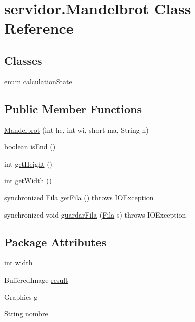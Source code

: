 \hypertarget{classservidor_1_1Mandelbrot}{}\section{servidor.\+Mandelbrot Class Reference}
\label{classservidor_1_1Mandelbrot}
\subsection*{Classes}
\begin{DoxyCompactItemize}
\item 
enum \hyperlink{enumservidor_1_1Mandelbrot_1_1calculationState}{calculation\+State}
\end{DoxyCompactItemize}
\subsection*{Public Member Functions}
\begin{DoxyCompactItemize}
\item 
\hyperlink{classservidor_1_1Mandelbrot_a2db8624e4b8e35be6c0d11c2ba66db41}{Mandelbrot} (int he, int wi, short ma, String n)
\item 
boolean \hyperlink{classservidor_1_1Mandelbrot_a3fc4593c70644aa3664e282b0cdfd0a3}{is\+End} ()
\item 
int \hyperlink{classservidor_1_1Mandelbrot_a905432e23be2e50504d449c29af8c030}{get\+Height} ()
\item 
int \hyperlink{classservidor_1_1Mandelbrot_a8852f55f8065884efcbb17ab789401ce}{get\+Width} ()
\item 
synchronized \hyperlink{classservidor_1_1Fila}{Fila} \hyperlink{classservidor_1_1Mandelbrot_ac31fee99afedf55af9e50a920398927d}{get\+Fila} ()  throws I\+O\+Exception
\item 
synchronized void \hyperlink{classservidor_1_1Mandelbrot_a46450ff3801397824de8fdb6bf82c6e3}{guardar\+Fila} (\hyperlink{classservidor_1_1Fila}{Fila} s)  throws I\+O\+Exception
\end{DoxyCompactItemize}
\subsection*{Package Attributes}
\begin{DoxyCompactItemize}
\item 
int \hyperlink{classservidor_1_1Mandelbrot_afc820ea6c9992894d55fa4c024ee7fb1}{width}
\item 
Buffered\+Image \hyperlink{classservidor_1_1Mandelbrot_a7ffdb7e65dc12cace2516fdb2882d47d}{result}
\item 
Graphics \hyperlink{classservidor_1_1Mandelbrot_afc3c91039c0345ef6a23b55eff765a03}{g}
\item 
String \hyperlink{classservidor_1_1Mandelbrot_ae1f139c807578878bf03527602d6a91f}{nombre}
\end{DoxyCompactItemize}
